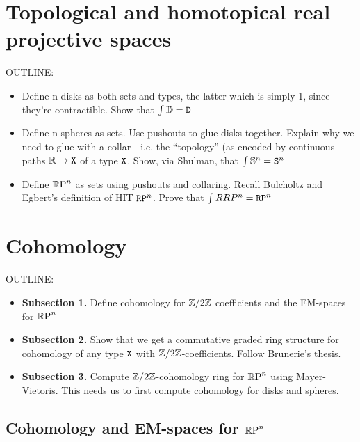 \documentclass{amsart}
\begin{document}
\section{Topological and homotopical real projective spaces}
\label{sec:rpn}

OUTLINE:
\begin{itemize}
\item
  Define n-disks as both sets and types, the latter which is
  simply 1, since they're contractible. Show that $ \int
  \mathbb{D} = \mathtt{D} $
\item
  Define n-spheres as sets.  Use pushouts to glue
  disks together. Explain why we need to glue with a
  collar---i.e. the ``topology'' (as encoded by continuous
  paths $ \mathbb{R} \to \mathtt{X} $ of a type $ \mathtt{X} $. Show, via Shulman,
  that $ \int \mathbb{S}^n = \mathtt{S}^n $
\item
  Define $ \mathbb{R}\textrm{P}^n $ as sets using pushouts and collaring.
  Recall Bulcholtz and Egbert's definition of HIT $ \mathtt{RP}^n
  $. Prove that $ \int RRP^n = \mathtt{RP}^n $
\end{itemize}


\section{Cohomology}
\label{sec:cohom}

OUTLINE:
\begin{itemize}
\item 
  \textbf{Subsection 1.} 
  Define cohomology for $ \mathbb{Z}/2\mathbb{Z} $ coefficients and the
  EM-spaces for $ \mathbb{R}\textrm{P}^n $
\item
  \textbf{Subsection 2.} Show that we get a commutative
  graded ring structure for cohomology of any type $ \mathtt{X} $
  with $ \mathbb{Z}/2\mathbb{Z} $-coefficients. Follow Brunerie's thesis.
\item
  \textbf{Subsection 3.} Compute $ \mathbb{Z}/2\mathbb{Z} $-cohomology ring
  for $ \mathbb{R}\textrm{P}^n $ using Mayer-Vietoris.  This needs us to
  first compute cohomology for disks and spheres.  
\end{itemize}


\subsection{Cohomology and EM-spaces for $\mathbb{R}\textrm{P}^n$}
\end{document}
